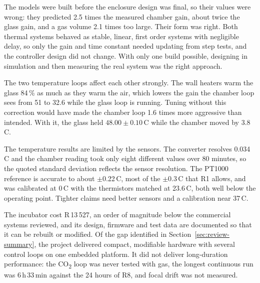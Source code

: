The models were built before the enclosure design was final, so their values were wrong: they predicted 2.5 times the measured chamber gain, about twice the glass gain, and a gas volume 2.1 times too large. Their form was right. Both thermal systems behaved as stable, linear, first order systems with negligible delay, so only the gain and time constant needed updating from step tests, and the controller design did not change. With only one build possible, designing in simulation and then measuring the real system was the right approach.

The two temperature loops affect each other strongly. The wall heaters warm the glass 84\,\% as much as they warm the air, which lowers the gain the chamber loop sees from 51 to 32.6 while the glass loop is running. Tuning without this correction would have made the chamber loop 1.6 times more aggressive than intended. With it, the glass held $48.00 \pm 0.10$\,\textdegree{}C while the chamber moved by 3.8\,\textdegree{}C. 

The temperature results are limited by the sensors. The converter resolves 0.034\,\textdegree{}C and the chamber reading took only eight different values over 80 minutes, so the quoted standard deviation reflects the sensor resolution. The PT1000 reference is accurate to about $\pm$0.22\,\textdegree{}C, most of the $\pm$0.3\,\textdegree{}C that R1 allows, and was calibrated at 0\,\textdegree{}C with the thermistors matched at 23.6\,\textdegree{}C, both well below the operating point. Tighter claims need better sensors and a calibration near 37\,\textdegree{}C.

The incubator cost R\,13\,527, an order of magnitude below the commercial systems reviewed, and its design, firmware and test data are documented so that it can be rebuilt or modified. Of the gap identified in Section~\ref{sec:review-summary}, the project delivered compact, modifiable hardware with several control loops on one embedded platform. It did not deliver long-duration performance: the CO\textsubscript{2} loop was never tested with gas, the longest continuous run was 6\,h\,33\,min against the 24 hours of R8, and focal drift was not measured.
